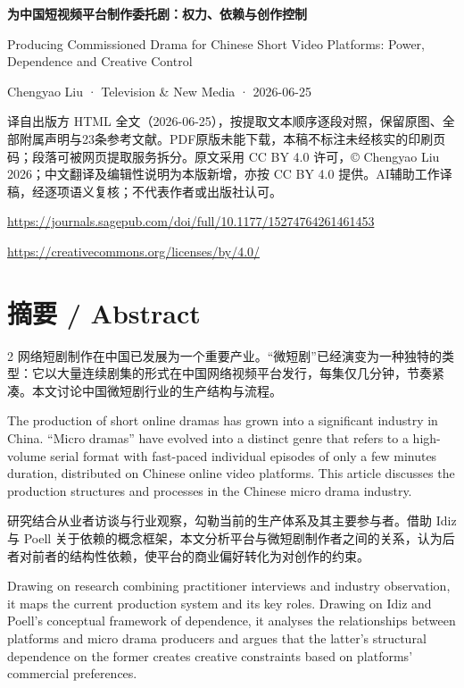 \documentclass[10pt,a4paper]{article}
\begin{document}
{\Large\bfseries 为中国短视频平台制作委托剧：权力、依赖与创作控制\par}\medskip
Producing Commissioned Drama for Chinese Short Video Platforms: Power, Dependence and Creative Control\par
Chengyao Liu · Television \& New Media · 2026-06-25\par
译自出版方 HTML 全文（2026-06-25），按提取文本顺序逐段对照，保留原图、全部附属声明与23条参考文献。PDF原版未能下载，本稿不标注未经核实的印刷页码；段落可被网页提取服务拆分。原文采用 CC BY 4.0 许可，© Chengyao Liu 2026；中文翻译及编辑性说明为本版新增，亦按 CC BY 4.0 提供。AI辅助工作译稿，经逐项语义复核；不代表作者或出版社认可。\par
\url{https://journals.sagepub.com/doi/full/10.1177/15274764261461453}\par
\url{https://creativecommons.org/licenses/by/4.0/}\par\bigskip
\section*{摘要 / Abstract}
\begin{paracol}{2}
网络短剧制作在中国已发展为一个重要产业。“微短剧”已经演变为一种独特的类型：它以大量连续剧集的形式在中国网络视频平台发行，每集仅几分钟，节奏紧凑。本文讨论中国微短剧行业的生产结构与流程。\par
\switchcolumn
The production of short online dramas has grown into a significant industry in China. “Micro dramas” have evolved into a distinct genre that refers to a high-volume serial format with fast-paced individual episodes of only a few minutes duration, distributed on Chinese online video platforms. This article discusses the production structures and processes in the Chinese micro drama industry.\par
\switchcolumn*
研究结合从业者访谈与行业观察，勾勒当前的生产体系及其主要参与者。借助 Idiz 与 Poell 关于依赖的概念框架，本文分析平台与微短剧制作者之间的关系，认为后者对前者的结构性依赖，使平台的商业偏好转化为对创作的约束。\par
\switchcolumn
Drawing on research combining practitioner interviews and industry observation, it maps the current production system and its key roles. Drawing on Idiz and Poell’s conceptual framework of dependence, it analyses the relationships between platforms and micro drama producers and argues that the latter’s structural dependence on the former creates creative constraints based on platforms’ commercial preferences.\par
\switchcolumn*
\end{paracol}
\end{document}
